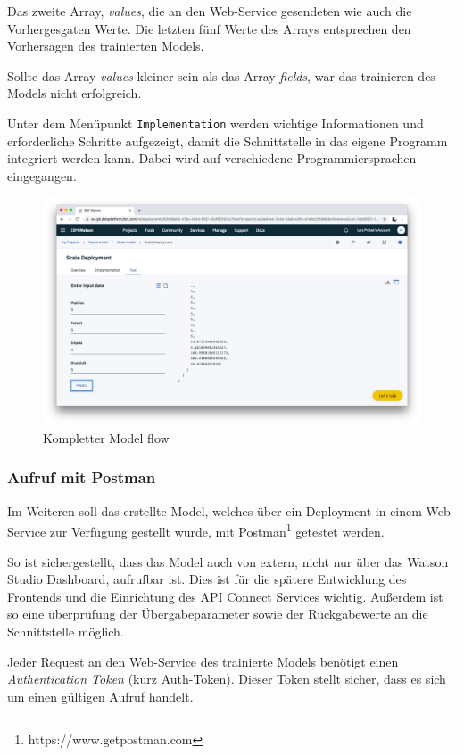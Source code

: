 Das zweite Array, \textit{values}, die an den Web-Service gesendeten wie auch die Vorhergesgaten Werte.
Die letzten fünf Werte des Arrays entsprechen den Vorhersagen des trainierten Models.

Sollte das Array \textit{values} kleiner sein als das Array \textit{fields}, war das trainieren des Models nicht
erfolgreich.

Unter dem Menüpunkt \texttt{Implementation} werden wichtige Informationen und erforderliche Schritte aufgezeigt, damit
die Schnittstelle in das eigene Programm integriert werden kann. Dabei wird auf verschiedene Programmiersprachen
eingegangen.

\begin{figure}[h]
    \centering
    \includegraphics[scale=0.26]{images/kapitel_3/deployment_test.png}
    \caption{Kompletter Model flow}
    \label{fig:umsetzung_deployment_test}
\end{figure}

\subsubsection{Aufruf mit Postman}
\label{subsec:Aufruf mit Postman}
Im Weiteren soll das erstellte Model, welches über ein Deployment in einem Web-Service zur Verfügung gestellt wurde,
mit Postman\footnote{https://www.getpostman.com} getestet werden.

So ist sichergestellt, dass das Model auch von extern, nicht nur über das Watson Studio Dashboard, aufrufbar ist.
Dies ist für die spätere Entwicklung des Frontends und die Einrichtung des API Connect Services wichtig. Außerdem ist
so eine überprüfung der Übergabeparameter sowie der Rückgabewerte an die Schnittstelle möglich.

Jeder Request an den Web-Service des trainierte Models benötigt einen \textit{Authentication Token} (kurz Auth-Token).
Dieser Token stellt sicher, dass es sich um einen gültigen Aufruf handelt.

